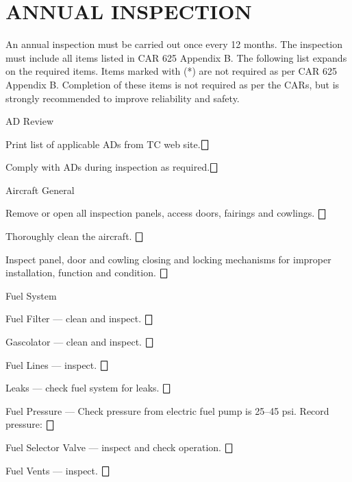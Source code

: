 \section{ANNUAL INSPECTION} An annual inspection must be carried out once every 12 months.  The inspection must include all items listed in CAR 625 Appendix B.  The following list expands on the required items.  Items marked with (*) are not required as per CAR 625 Appendix B.  Completion of these items is not required as per the CARs, but is strongly recommended to improve reliability and safety.

\begin{enumerate*}
	\item{AD Review}
	\begin{enumerate*}
		\item Print list of applicable ADs from TC web site.\dotfill $\bigbox$
		\item Comply with ADs during inspection as required.\dotfill $\bigbox$
	\end{enumerate*}

  \item{Aircraft General}
  \begin{enumerate*}
    \item Remove or open all inspection panels, access doors, fairings and cowlings. \dotfill $\bigbox$
    \item Thoroughly clean the aircraft. \dotfill $\bigbox$
    \item Inspect panel, door and cowling closing and locking mechanisms for improper installation, function and condition. \dotfill $\bigbox$
		\end{enumerate*}

	\item{Fuel System} 
	\begin{enumerate*}
		\item Fuel Filter --- clean and inspect.  \dotfill $\bigbox$
		\item Gascolator --- clean and inspect.  \dotfill $\bigbox$
		\item Fuel Lines --- inspect. \dotfill $\bigbox$
		\item Leaks --- check fuel system for leaks. \dotfill $\bigbox$
		\item Fuel Pressure --- Check pressure from electric fuel pump is 25--45 psi. Record pressure: \underline{\makebox[0.5in][l]{}} \dotfill $\bigbox$
		\item Fuel Selector Valve --- inspect and check operation. \dotfill $\bigbox$
		\item Fuel Vents --- inspect. \dotfill $\bigbox$
	\end{enumerate*}



\end{enumerate*}
